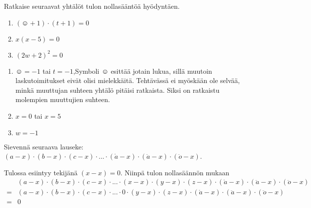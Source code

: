 \begin{tehtava}
    Ratkaise seuraavat yhtälöt tulon nollasääntöä hyödyntäen.
    \begin{enumerate}
        \item $(\smiley{}+1)\cdot (t+1)=0$
        \item $x(x-5)=0$
        \item $(2w+2)^2=0$
    \end{enumerate}
    \begin{vastaus}
        \begin{enumerate}
            \item $\smiley{}=-1$ tai $t=-1$,\qquad  Symboli $\smiley{}$ esittää jotain lukua, sillä muutoin laskutoimitukset eivät olisi mielekkäitä. Tehtävässä ei myöskään ole selvää, minkä muuttujan suhteen yhtälö pitäisi ratkaista. Siksi on ratkaistu molempien muuttujien suhteen.
            \item $x=0$ tai $x=5$
            \item $w=-1$
        \end{enumerate}
    \end{vastaus}
\end{tehtava}

\begin{tehtava}
    Sievennä seuraava lauseke: $(a-x)\cdot(b-x)\cdot(c-x)\cdot...\cdot(\mathring{a}-x)\cdot(\ddot{a}-x)\cdot(\ddot{o}-x)$.
    \begin{vastaus}
        Tulossa esiintyy tekijänä $(x-x)=0$. Niinpä tulon nollasäännön mukaan
        \begin{align*}
            &(a-x)\cdot(b-x)\cdot(c-x)\cdot...\cdot(x-x)\cdot(y-x)\cdot(z-x)\cdot(\mathring{a}-x)\cdot(\ddot{a}-x)\cdot(\ddot{o}-x) \\
            =&(a-x)\cdot(b-x)\cdot(c-x)\cdot...\cdot 0\cdot(y-x)\cdot(z-x)\cdot(\mathring{a}-x)\cdot(\ddot{a}-x)\cdot(\ddot{o}-x) \\
            =&0
        \end{align*}
    \end{vastaus}
\end{tehtava}
